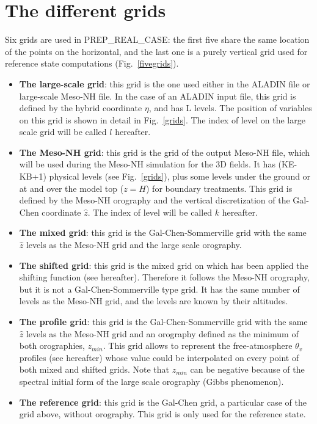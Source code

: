 \section{The different grids \label{prealgrid}}
Six grids are used in PREP\_REAL\_CASE: the first five share the same
location of the points on the horizontal, and the last one is a purely
vertical grid used for reference state computations (Fig.~\ref{fivegrids}).
\begin{itemize}
\item
{\bf{The large-scale grid}}: this grid is the one used either in the ALADIN file
or large-scale Meso-NH file. In the case of an ALADIN input file, this grid is
defined by the hybrid coordinate $\eta$, and has L levels. The position of
variables on this grid is shown in detail in Fig.~\ref{grids}. The
index of level on the large scale grid will be called $l$ hereafter.
\item
{\bf{The Meso-NH grid}}: this grid is the grid of the output Meso-NH file, which will be
used during the Meso-NH simulation for the 3D fields. It has (KE-KB+1)
physical levels (see Fig.~\ref{grids}), plus some levels under the ground or
at and over the model top ($z=H$) for boundary treatments.
This grid is defined by the Meso-NH orography and the vertical discretization
of the Gal-Chen coordinate $\widehat{z}$. The index of level will be called
$k$ hereafter.
\item
{\bf{The mixed grid}}: this grid is the Gal-Chen-Sommerville grid with
the same $\widehat{z}$ levels as the Meso-NH grid and the large scale
orography.
\item
{\bf{The shifted grid}}: this grid is the mixed grid on which has been applied
the shifting function (see hereafter). Therefore it follows the Meso-NH
orography, but it is not a Gal-Chen-Sommerville type grid.
It has the same number of levels as the Meso-NH grid, and the
levels are known by their altitudes.
\item
{\bf{The profile grid}}: this grid is the Gal-Chen-Sommerville grid with
the same $\widehat{z}$ levels as the Meso-NH grid and an orography defined
as the minimum of both orographies, $z_{min}$.
This grid allows to represent the free-atmosphere $\theta_v$ profiles
(see hereafter) whose value could be interpolated
on every point of both mixed and shifted grids. Note that $z_{min}$ can be
negative because of the spectral initial form of the large scale orography
(Gibbs phenomenon).
\item
{\bf{The reference grid}}: this grid is the Gal-Chen grid, a particular case of the
grid above, without orography. This grid is only used for the reference state.
\end{itemize}

